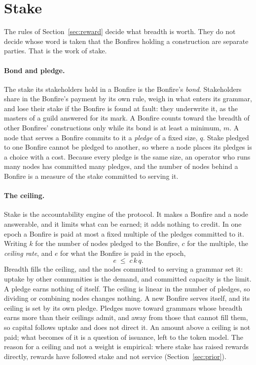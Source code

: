 \section{Stake}\label{sec:bond}

The rules of Section~\ref{sec:reward} decide what breadth is worth. They do not decide whose word is taken that
the Bonfires holding a construction are separate parties. That is the work of stake.

\paragraph{Bond and pledge.} The stake its stakeholders hold in a Bonfire is the Bonfire's \emph{bond}.
Stakeholders share in the Bonfire's payment by its own rule, weigh in what enters its grammar, and lose their stake
if the Bonfire is found at fault: they underwrite it, as the masters of a guild answered for its mark. A Bonfire
counts toward the breadth of other Bonfires' constructions only while its bond is at least a minimum, $m$. A node
that serves a Bonfire commits to it a \emph{pledge} of a fixed size, $q$. Stake pledged to one Bonfire cannot be
pledged to another, so where a node places its pledges is a choice with a cost. Because every pledge is the same
size, an operator who runs many nodes has committed many pledges, and the number of nodes behind a Bonfire is a
measure of the stake committed to serving it.

\paragraph{The ceiling.} Stake is the accountability engine of the protocol. It makes a Bonfire and a node
answerable, and it limits what can be earned; it adds nothing to credit. In one epoch a Bonfire is paid at most a
fixed multiple of the pledges committed to it. Writing $k$ for the number of nodes pledged to the Bonfire, $c$ for
the multiple, the \emph{ceiling rate}, and $e$ for what the Bonfire is paid in the epoch,
\begin{equation}\label{eq:ceiling}
  e \;\le\; c\,k\,q .
\end{equation}
Breadth fills the ceiling, and the nodes committed to serving a grammar set it: uptake by other communities is the
demand, and committed capacity is the limit. A pledge earns nothing of itself. The ceiling is linear in the number
of pledges, so dividing or combining nodes changes nothing. A new Bonfire serves itself, and its ceiling is set by its own pledge. Pledges move toward grammars whose breadth earns more than their ceilings admit, and away from those that
cannot fill them, so capital follows uptake and does not direct it. An amount above a ceiling is not paid; what
becomes of it is a question of issuance, left to the token model. The reason for a ceiling and not a weight is
empirical: where stake has raised rewards directly, rewards have followed stake and not service
(Section~\ref{sec:prior}).

